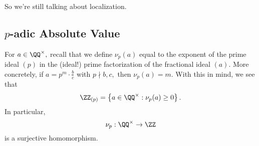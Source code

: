 
















So we're still talking about localization.

\subsection{\texorpdfstring{$p$}{}-adic Absolute Value}
For $a\in\QQ^\times,$ recall that we define $\nu_p(a)$ equal to the exponent of the prime ideal $(p)$ in the (ideal!) prime factorization of the fractional ideal $(a).$ More concretely, if $a=p^m\cdot\frac bc$ with $p\nmid b,c,$ then $\nu_p(a)=m.$ With this in mind, we see that
\[\ZZ_{(p)}=\left\{a\in\QQ^\times:\nu_p(a)\ge0\right\}.\]
In particular,
\[\nu_p:\QQ^\times\to\ZZ\]
is a surjective homomorphism.

